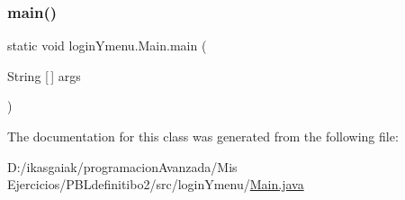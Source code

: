 \subsubsection{\texorpdfstring{main()}{main()}}
{\footnotesize\ttfamily static void login\+Ymenu.\+Main.\+main (\begin{DoxyParamCaption}\item[{String \mbox{[}$\,$\mbox{]}}]{args }\end{DoxyParamCaption})\hspace{0.3cm}{\ttfamily [static]}}



The documentation for this class was generated from the following file\+:\begin{DoxyCompactItemize}
\item 
D\+:/ikasgaiak/programacion\+Avanzada/\+Mis Ejercicios/\+P\+B\+Ldefinitibo2/src/login\+Ymenu/\mbox{\hyperlink{_main_8java}{Main.\+java}}\end{DoxyCompactItemize}
